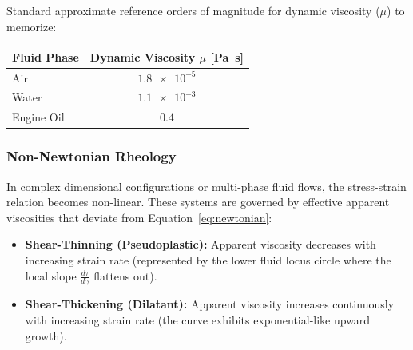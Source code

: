 Standard approximate reference orders of magnitude for dynamic viscosity ($\mu$) to memorize:
\begin{center}
\begin{tabular}{lc}
    \toprule
    \textbf{Fluid Phase} & \textbf{Dynamic Viscosity $\mu$ [\si{\pascal\second}]} \\
    \midrule
    Air & $\num{1.8e-5}$ \\
    Water & $\num{1.1e-3}$ \\
    Engine Oil & $\num{0.4}$ \\
    \bottomrule
\end{tabular}
\end{center}

\subsubsection{Non-Newtonian Rheology}
In complex dimensional configurations or multi-phase fluid flows, the stress-strain relation becomes non-linear. These systems are governed by effective apparent viscosities that deviate from Equation~\ref{eq:newtonian}:

\begin{center}
\end{center}

\begin{itemize}
    \item \textbf{Shear-Thinning (Pseudoplastic):} Apparent viscosity decreases with increasing strain rate (represented by the lower fluid locus circle where the local slope $\frac{d\tau}{d\dot{\gamma}}$ flattens out).
    \item \textbf{Shear-Thickening (Dilatant):} Apparent viscosity increases continuously with increasing strain rate (the curve exhibits exponential-like upward growth).
\end{itemize}


